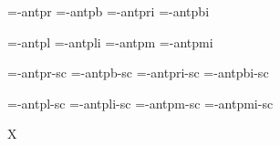 
\ifx\sizespec\undefined \def\sizespec{}\fi
\ifx\font\corkencoded {}\else {}\fi


\ifx\dgsize\undefined {}\fi

\font\tenrm=\tmp-antpr\dgsize  \space\sizespec
\font\tenbf=\tmp-antpb\dgsize  \space\sizespec
\font\tenit=\tmp-antpri\dgsize \space\sizespec
\font\tenbi=\tmp-antpbi\dgsize \space\sizespec

\font\tenlr=\tmp-antpl\dgsize  \space\sizespec  \def\lr{\tenlr}
\font\tenli=\tmp-antpli\dgsize \space\sizespec  \def\li{\tenli}
\font\tenmr=\tmp-antpm\dgsize  \space\sizespec  \def\mr{\tenmr}
\font\tenmi=\tmp-antpmi\dgsize \space\sizespec  \def\mi{\tenmi}

\font\tenrmc=\tmp-antpr\dgsize-sc  \sizespec
\font\tenbfc=\tmp-antpb\dgsize-sc  \sizespec
\font\tenitc=\tmp-antpri\dgsize-sc \sizespec
\font\tenbic=\tmp-antpbi\dgsize-sc \sizespec

\font\tenlrc=\tmp-antpl\dgsize-sc  \sizespec 
\font\tenlic=\tmp-antpli\dgsize-sc \sizespec
\font\tenmrc=\tmp-antpm\dgsize-sc  \sizespec
\font\tenmic=\tmp-antpmi\dgsize-sc \sizespec

\let\dgsize=\undefined

\tenrm


\def\caps#1{{\escapechar=-1 \expandafter}%
  \expandafter\csname\expandafter\tenonlytext\string#1c\endcsname}
\def\tenonlytext{ten}

\ifx\regfont\undefined \else
  \regfont\tenrm  \regfont\tenit
  \regfont\tenbf  \regfont\tenbi 
  \regfont\tenlr  \regfont\tenli
  \regfont\tenmr  \regfont\tenmi
  \regfont\tenrmc \regfont\tenitc
  \regfont\tenbfc \regfont\tenbic
  \regfont\tenlrc \regfont\tenlic
  \regfont\tenmrc \regfont\tenmic
\fi

\ifx\mathpreloaded X\else  \fi                     

\ifx\font\corkencoded \else  \fi

